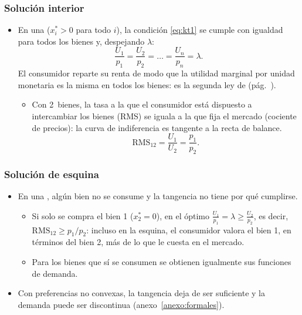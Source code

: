 \documentclass[11pt]{article}
\begin{document}
\subsubsection{Solución interior}\label{sec:solucion-interior}

\begin{itemize}
\item En una  ($x_i^*>0$ para todo $i$), la condición \eqref{eq:kt1} se cumple con igualdad para todos los bienes y, despejando $\lambda$:
  \begin{equation}
  \frac{U_1}{p_1}=\frac{U_2}{p_2}=\dots=\frac{U_n}{p_n}=\lambda. \label{eq:gossen}
  \end{equation}
  El consumidor reparte su renta de modo que la utilidad marginal por unidad monetaria es la misma en todos los bienes: es la segunda ley de  (pág.~\pageref{ley:gossen2}).
  \begin{itemize}
  \item Con 2~bienes, la tasa a la que el consumidor está dispuesto a intercambiar los bienes (RMS) se iguala a la que fija el mercado (cociente de precios): la curva de indiferencia es tangente a la recta de balance.
    \begin{equation}
    \mathrm{RMS}_{12}=\frac{U_1}{U_2}=\frac{p_1}{p_2}. \label{eq:tangencia}
    \end{equation}
  \end{itemize}
\end{itemize}

\subsubsection{Solución de esquina}\label{sec:solucion-esquina}

\begin{itemize}
\item En una , algún bien no se consume y la tangencia no tiene por qué cumplirse.
  \begin{itemize}
  \item Si solo se compra el bien 1 ($x_2^*=0$), en el óptimo $\frac{U_1}{p_1}=\lambda\geq\frac{U_2}{p_2}$, es decir, $\mathrm{RMS}_{12}\geq p_1/p_2$: incluso en la esquina, el consumidor valora el bien 1, en términos del bien 2, más de lo que le cuesta en el mercado.
  \item Para los bienes que sí se consumen se obtienen igualmente sus funciones de demanda.
  \end{itemize}
\item Con preferencias no convexas, la tangencia deja de ser suficiente y la demanda puede ser discontinua (anexo~\ref{anexo:formales}).
\end{itemize}
\end{document}

